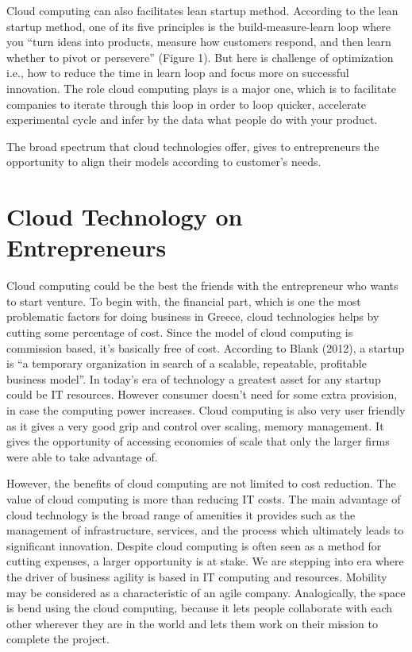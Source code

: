 \documentclass[notitlepage]{report}
\begin{document}
Cloud computing can also facilitates lean startup method. According to the lean startup method, one of its five principles is the build-measure-learn loop where you “turn ideas into products, measure how customers respond, and then learn whether to pivot or persevere” (Figure 1). But here is challenge of optimization i.e., how to reduce the time in learn loop and focus more on successful innovation. The role cloud computing plays is a major one, which is to facilitate companies to iterate through this loop in order to loop quicker, accelerate experimental cycle and infer by the data what people do with your product.

 The broad spectrum that cloud technologies offer, gives to entrepreneurs the opportunity to align their models according to customer’s needs.


\section*{Cloud Technology on Entrepreneurs}

Cloud computing could be the best the friends with the entrepreneur who wants to start venture. To begin with, the financial part, which is one the most problematic factors for doing business in Greece, cloud technologies helps by cutting some percentage of cost. Since the model of cloud computing is commission based, it’s basically free of cost. According to Blank (2012), a startup is “a temporary organization in search of a scalable, repeatable, profitable business model”. In today’s era of technology a greatest asset for any startup could be IT resources. However consumer doesn’t need for some extra provision, in case the computing power increases. Cloud computing is also very user friendly as it gives a very good grip and control over scaling, memory management. It gives the opportunity of accessing economies of scale that only the larger firms were able to take advantage of. 

However, the benefits of cloud computing are not limited to cost reduction. The value of cloud computing is more than reducing IT costs. The main advantage of cloud technology is the broad range of amenities it provides such as the management of infrastructure,   services, and the process which ultimately leads to significant innovation. Despite cloud computing is often seen as a method for cutting expenses, a larger opportunity is at stake. We are stepping into era where the driver of business agility is based in IT computing and resources. Mobility may be considered as a characteristic of an agile company. Analogically, the space is bend using the cloud computing, because it lets people collaborate with each other wherever they are in the world and lets them work on their mission to complete the project.
\end{document}
